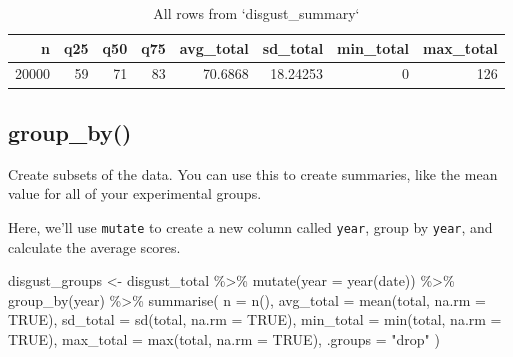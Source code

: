 \documentclass[
  oneside]{book}
\newenvironment{Shaded}{\begin{snugshade}}{\end{snugshade}}
\newcommand{\AttributeTok}[1]{\textcolor[rgb]{0.77,0.63,0.00}{#1}}
\newcommand{\ConstantTok}[1]{\textcolor[rgb]{0.00,0.00,0.00}{#1}}
\newcommand{\FunctionTok}[1]{\textcolor[rgb]{0.00,0.00,0.00}{#1}}
\newcommand{\NormalTok}[1]{#1}
\newcommand{\OtherTok}[1]{\textcolor[rgb]{0.56,0.35,0.01}{#1}}
\newcommand{\SpecialCharTok}[1]{\textcolor[rgb]{0.00,0.00,0.00}{#1}}
\newcommand{\StringTok}[1]{\textcolor[rgb]{0.31,0.60,0.02}{#1}}
\begin{document}
\begin{table}

\caption{\label{tab:summarise}All rows from `disgust_summary`}
\centering
\begin{tabular}[t]{r|r|r|r|r|r|r|r}
\hline
n & q25 & q50 & q75 & avg\_total & sd\_total & min\_total & max\_total\\
\hline
20000 & 59 & 71 & 83 & 70.6868 & 18.24253 & 0 & 126\\
\hline
\end{tabular}
\end{table}

\hypertarget{group_by}{%
\subsection{group\_by()}\label{group_by}}

Create subsets of the data. You can use this to create summaries,
like the mean value for all of your experimental groups.

Here, we'll use \texttt{mutate} to create a new column called \texttt{year}, group by \texttt{year}, and calculate the average scores.

\begin{Shaded}
\begin{Highlighting}[]
\NormalTok{disgust\_groups }\OtherTok{\textless{}{-}}\NormalTok{ disgust\_total }\SpecialCharTok{\%\textgreater{}\%}
  \FunctionTok{mutate}\NormalTok{(}\AttributeTok{year =} \FunctionTok{year}\NormalTok{(date)) }\SpecialCharTok{\%\textgreater{}\%}
  \FunctionTok{group\_by}\NormalTok{(year) }\SpecialCharTok{\%\textgreater{}\%}
  \FunctionTok{summarise}\NormalTok{(}
    \AttributeTok{n =} \FunctionTok{n}\NormalTok{(),}
    \AttributeTok{avg\_total =} \FunctionTok{mean}\NormalTok{(total, }\AttributeTok{na.rm =} \ConstantTok{TRUE}\NormalTok{),}
    \AttributeTok{sd\_total  =} \FunctionTok{sd}\NormalTok{(total, }\AttributeTok{na.rm =} \ConstantTok{TRUE}\NormalTok{),}
    \AttributeTok{min\_total =} \FunctionTok{min}\NormalTok{(total, }\AttributeTok{na.rm =} \ConstantTok{TRUE}\NormalTok{),}
    \AttributeTok{max\_total =} \FunctionTok{max}\NormalTok{(total, }\AttributeTok{na.rm =} \ConstantTok{TRUE}\NormalTok{),}
    \AttributeTok{.groups =} \StringTok{"drop"}
\NormalTok{  )}
\end{Highlighting}
\end{Shaded}
\end{document}
